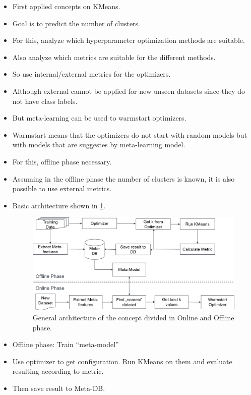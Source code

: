 \begin{itemize}
    \item First applied concepts on KMeans.
    \item Goal is to predict the number of clusters.
    \item For this, analyze which hyperparameter optimization methods are suitable.
    \item Also analyze which metrics are suitable for the different methods.
    \item So use internal/external metrics for the optimizers.
    \item Although external cannot be applied for new unseen datasets since they do not have class labels.
    \item But meta-learning can be used to warmstart optimizers.
    \item Warmstart means that the optimizers do not start with random models but with models that are suggestes by meta-learning model.
    \item For this, offline phase necessary.
    \item Assuming in the offline phase the number of clusters is known, it is also possible to use external metrics.
    \item Basic architecture shown in \cref{fig:concept_arch}.
    \begin{figure}
        \centering
        \includegraphics[width=\textwidth]{graphics/concept_architecture.png}
        \caption{General architecture of the concept divided in Online and Offline phase.}
        \label{fig:concept_arch}
    \end{figure}
    \item Offline phase: Train ``meta-model''
    \item Use optimizer to get configuration. Run KMeans on them and evaluate resulting according to metric.
    \item Then save result to Meta-DB.

\end{itemize}
